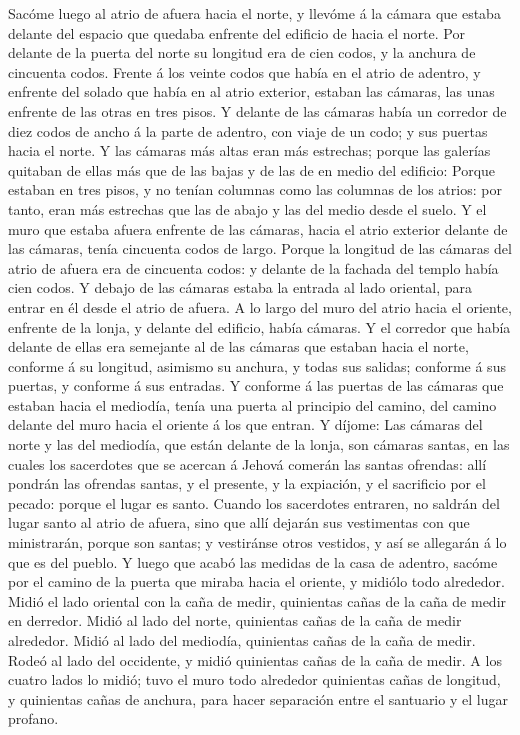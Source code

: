  Sacóme luego al atrio de afuera hacia el norte, y llevóme á
la cámara que estaba delante del espacio que quedaba enfrente del
edificio de hacia el norte.  Por delante de la puerta del
norte su longitud era de cien codos, y la anchura de cincuenta codos.
 Frente á los veinte codos que había en el atrio de adentro,
y enfrente del solado que había en al atrio exterior, estaban las
cámaras, las unas enfrente de las otras en tres pisos.  Y
delante de las cámaras había un corredor de diez codos de ancho á la
parte de adentro, con viaje de un codo; y sus puertas hacia el norte.
 Y las cámaras más altas eran más estrechas; porque las
galerías quitaban de ellas más que de las bajas y de las de en medio del
edificio:  Porque estaban en tres pisos, y no tenían
columnas como las columnas de los atrios: por tanto, eran más estrechas
que las de abajo y las del medio desde el suelo.  Y el muro
que estaba afuera enfrente de las cámaras, hacia el atrio exterior
delante de las cámaras, tenía cincuenta codos de largo. 
Porque la longitud de las cámaras del atrio de afuera era de cincuenta
codos: y delante de la fachada del templo había cien codos. 
Y debajo de las cámaras estaba la entrada al lado oriental, para entrar
en él desde el atrio de afuera.  A lo largo del muro del
atrio hacia el oriente, enfrente de la lonja, y delante del edificio,
había cámaras.  Y el corredor que había delante de ellas
era semejante al de las cámaras que estaban hacia el norte, conforme á
su longitud, asimismo su anchura, y todas sus salidas; conforme á sus
puertas, y conforme á sus entradas.  Y conforme á las
puertas de las cámaras que estaban hacia el mediodía, tenía una puerta
al principio del camino, del camino delante del muro hacia el oriente á
los que entran.  Y díjome: Las cámaras del norte y las del
mediodía, que están delante de la lonja, son cámaras santas, en las
cuales los sacerdotes que se acercan á Jehová comerán las santas
ofrendas: allí pondrán las ofrendas santas, y el presente, y la
expiación, y el sacrificio por el pecado: porque el lugar es santo.
 Cuando los sacerdotes entraren, no saldrán del lugar santo
al atrio de afuera, sino que allí dejarán sus vestimentas con que
ministrarán, porque son santas; y vestiránse otros vestidos, y así se
allegarán á lo que es del pueblo.  Y luego que acabó las
medidas de la casa de adentro, sacóme por el camino de la puerta que
miraba hacia el oriente, y midiólo todo alrededor.  Midió
el lado oriental con la caña de medir, quinientas cañas de la caña de
medir en derredor.  Midió al lado del norte, quinientas
cañas de la caña de medir alrededor.  Midió al lado del
mediodía, quinientas cañas de la caña de medir.  Rodeó al
lado del occidente, y midió quinientas cañas de la caña de medir.
 A los cuatro lados lo midió; tuvo el muro todo alrededor
quinientas cañas de longitud, y quinientas cañas de anchura, para hacer
separación entre el santuario y el lugar profano.

